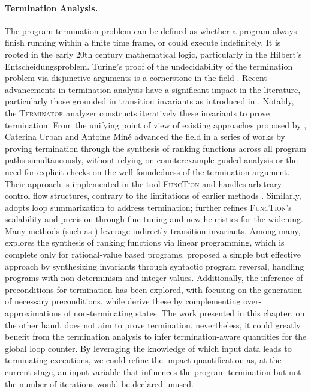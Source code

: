 \paragraph{Termination Analysis.}


The program termination problem can be defined as whether a program always finish running within a finite time frame, or could execute indefinitely.
It is rooted in the early 20th century mathematical logic, particularly in the Hilbert's Entscheidungsproblem. Turing's proof of the undecidability of the termination problem via disjunctive arguments is a cornerstone in the field .
Recent advancements in termination analysis have a significant impact in the literature, particularly those grounded in transition invariants as introduced in . Notably, the \textsc{Terminator} analyzer  constructs iteratively these invariants to prove termination.
From the unifying point of view of existing approaches proposed by ,
Caterina Urban and Antoine Min{\'{e}} advanced the field in a series of works  by proving termination through the synthesis of ranking functions across all program paths simultaneously, without relying on counterexample-guided analysis or the need for explicit checks on the well-foundedness of the termination argument.
Their approach is implemented in the tool \textsc{FuncTion}  and handles arbitrary control flow structures, contrary to the limitations of earlier methods .
Similarly,  adopts loop summarization to address termination;  further refines \textsc{FuncTion}'s scalability and precision through fine-tuning and new heuristics for the widening.
Many methods (such as ) leverage indirectly transition invariants. Among many, \textcite{Alias2010} explores the synthesis of ranking functions via linear programming, which is complete only for rational-value based programs.
 proposed a simple but effective approach by synthesizing invariants through syntactic program reversal, handling programs with non-determinism and integer values.
Additionally, the inference of preconditions for termination has been explored, with  focusing on the generation of necessary preconditions, while  derive these by complementing over-approximations of non-terminating states.
The work presented in this chapter, on the other hand, does not aim to prove termination, nevertheless, it could greatly benefit from the termination analysis to infer termination-aware quantities for the global loop counter.
By leveraging the knowledge of which input data leads to terminating executions, we could refine the impact quantification as, at the current stage, an input variable that influences the program termination but not the number of iterations would be declared unused.



